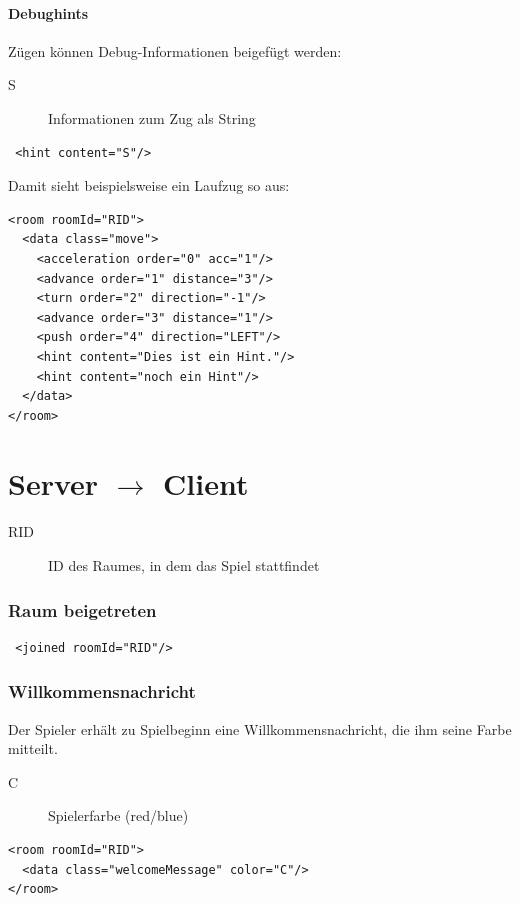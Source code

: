 \documentclass[12pt,a4paper, ngerman, oneside]{scrartcl}
\begin{document}
\subsection{Debughints}
Zügen können Debug-Informationen beigefügt werden:
\begin{description}
\item[S] Informationen zum Zug als String
\end{description}
\begin{verbatim}
 <hint content="S"/>
\end{verbatim}
Damit sieht beispielsweise ein Laufzug so aus:
\begin{verbatim}
<room roomId="RID">
  <data class="move">
    <acceleration order="0" acc="1"/>
    <advance order="1" distance="3"/>
    <turn order="2" direction="-1"/>
    <advance order="3" distance="1"/>
    <push order="4" direction="LEFT"/>
    <hint content="Dies ist ein Hint."/>
    <hint content="noch ein Hint"/>
  </data>
</room>
\end{verbatim}



\newpage
\part{Server $\rightarrow$ Client}
\begin{description}
\item[RID] ID des Raumes, in dem das Spiel stattfindet
\end{description}

\section{Raum beigetreten}
 \begin{verbatim}
 <joined roomId="RID"/>
 \end{verbatim}

\section{Willkommensnachricht}
Der Spieler erhält zu Spielbeginn eine Willkommensnachricht, die ihm seine Farbe mitteilt.
\begin{description}
\item[C] Spielerfarbe (red/blue)
\end{description}
\begin{verbatim}
<room roomId="RID">
  <data class="welcomeMessage" color="C"/>
</room>
\end{verbatim}
\end{document}
